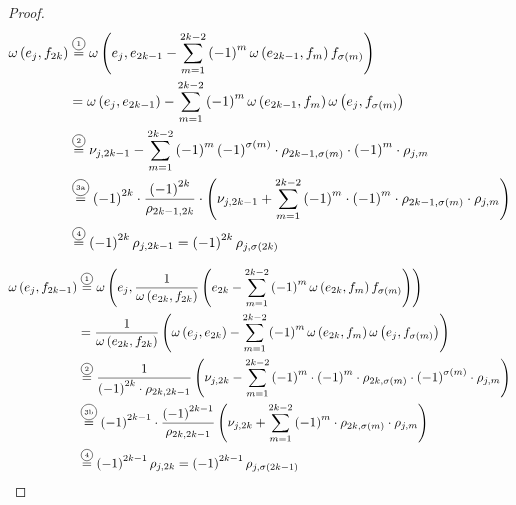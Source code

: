 \documentclass[../SymplecticSimplices.tex]{subfiles}
\begin{document}
\begin{proof}
  \begin{equation*}
    \begin{split}
      \omega \left( e_j, f_{2k} \right) & \eqcom{1} \omega \left( e_j, e_{2k-1} - \sum \limits _{m=1}^{2k-2} \left( -1 \right)^{m} \omega \left( e_{2k-1}, f_m \right) f_{\sigma \left( m \right)} \right) \\
                                        & = \omega \left( e_j, e_{2k-1} \right) - \sum \limits _{m=1}^{2k-2} \left( -1 \right)^{m} \omega \left( e_{2k-1}, f_m \right) \omega \left( e_j, f_{\sigma \left( m \right)} \right) \\
                                        & \eqcom{2} \nu_{j, 2k-1} - \sum \limits _{m=1}^{2k-2} \left( -1 \right)^{m} \left( -1 \right)^{\sigma \left( m \right)} \cdot \rho_{2k-1, \sigma \left( m \right)} \cdot \left( -1 \right)^m \cdot \rho_{j, m} \\
                                        & \eqcom{3a} \left( -1 \right)^{2k} \cdot \frac{\left( -1 \right)^{2k}}{\rho_{2k - 1, 2k}} \cdot \left( \nu_{j, 2k-1} + \sum \limits _{m=1}^{2k-2} \left( -1 \right)^{m} \cdot \left( -1 \right)^m \cdot \rho_{2k-1, \sigma \left( m \right)}\cdot \rho_{j, m} \right) \\
                                        & \eqcom{4} \left( -1 \right)^{2k} \rho_{j, 2k-1} = \left( -1 \right)^{2k} \rho_{j, \sigma \left( 2k \right)}
    \end{split}
  \end{equation*}

  \begin{equation*}
    \begin{split}
      \omega \left( e_j, f_{2k-1} \right) & \eqcom{1} \omega \left( e_j, \frac{1}{\omega \left( e_{2k}, f_{2k} \right)} \left( e_{2k} - \sum \limits _{m=1}^{2k-2} \left( -1 \right)^{m} \omega \left( e_{2k}, f_m \right) f_{\sigma \left( m \right)} \right) \right) \\
                                          & = \frac{1}{\omega \left( e_{2k}, f_{2k} \right)} \left( \omega \left( e_j, e_{2k} \right) - \sum \limits _{m=1}^{2k-2} \left( -1 \right)^{m} \omega \left( e_{2k}, f_m \right) \omega \left( e_j, f_{\sigma \left( m \right)} \right) \right) \\
                                          & \eqcom{2} \frac{1}{\left( -1 \right)^{2k} \cdot \rho_{2k, 2k-1}} \left( \nu_{j, 2k} - \sum \limits _{m=1}^{2k-2} \left( -1 \right)^{m} \cdot \left( -1 \right)^{m} \cdot \rho_{2k, \sigma \left(m \right)} \cdot \left( -1 \right)^{\sigma \left (m\right)} \cdot \rho_{j, m} \right) \\
                                          & \eqcom{3b} \left( -1 \right)^{2k-1} \cdot \frac{\left( -1 \right)^{2k-1}}{\rho_{2k, 2k-1}} \left( \nu_{j, 2k} + \sum \limits _{m=1}^{2k-2} \left( -1 \right)^{m} \cdot \rho_{2k, \sigma \left(m \right)} \cdot \rho_{j, m} \right) \\
                                          & \eqcom{4} \left( -1 \right)^{2k-1} \rho_{j, 2k} = \left( -1 \right)^{2k-1} \rho_{j, \sigma \left( 2k-1 \right)}
    \end{split}
  \end{equation*}


\end{proof}
\end{document}
